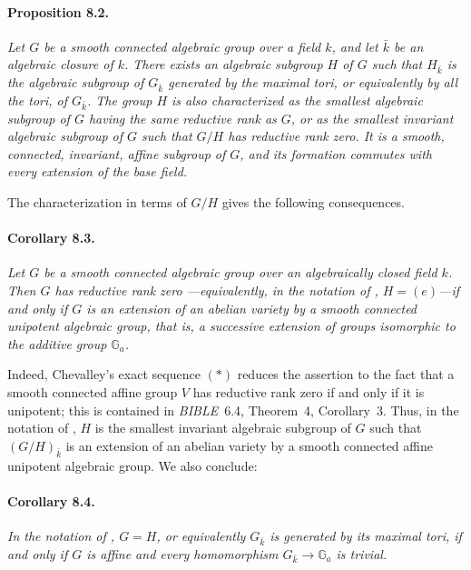 \paragraph{\textbf{Proposition 8.2.}}
\emph{Let \(G\) be a smooth connected algebraic group over a field
\(k\), and let \(\bar k\) be an algebraic closure of \(k\). There
exists an algebraic subgroup \(H\) of \(G\) such that
\(H_{\bar k}\) is the algebraic subgroup of \(G_{\bar k}\) generated
by the maximal tori, or equivalently by all the tori, of
\(G_{\bar k}\). The group \(H\) is also characterized as the
smallest algebraic subgroup of \(G\) having the same reductive rank
as \(G\), or as the smallest invariant algebraic subgroup of \(G\)
such that \(G/H\) has reductive rank zero. It is a smooth, connected,
invariant, affine subgroup of \(G\), and its formation commutes with
every extension of the base field.}

The characterization in terms of \(G/H\) gives the following
consequences.

\paragraph{\textbf{Corollary 8.3.}}
\emph{Let \(G\) be a smooth connected algebraic group over an
algebraically closed field \(k\). Then \(G\) has reductive rank zero
---equivalently, in the notation of , \(H=(e)\)---if and only if
\(G\) is an extension of an abelian variety by a smooth connected
unipotent algebraic group, that is, a successive extension of groups
isomorphic to the additive group \(\mathbb G_a\).}

Indeed, Chevalley's exact sequence \((*)\) reduces the assertion to
the fact that a smooth connected affine group \(V\) has reductive
rank zero if and only if it is unipotent; this is contained in
\emph{BIBLE}~6.4, Theorem~4, Corollary~3. Thus, in the notation of
, \(H\) is the smallest invariant algebraic subgroup of \(G\)
such that \((G/H)_{\bar k}\) is an extension of an abelian variety
by a smooth connected affine unipotent algebraic group. We also
conclude:

\paragraph{\textbf{Corollary 8.4.}}
\emph{In the notation of , \(G=H\), or equivalently
\(G_{\bar k}\) is generated by its maximal tori, if and only if
\(G\) is affine and every homomorphism
\(G_{\bar k}\to\mathbb G_a\) is trivial.}

